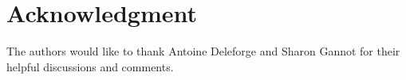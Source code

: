 \documentclass[journal]{IEEEtran}
\begin{document}
%


\section*{Acknowledgment}

The authors would like to thank Antoine Deleforge and Sharon Gannot for their helpful discussions and comments.


  \newpage







%


\end{document}
